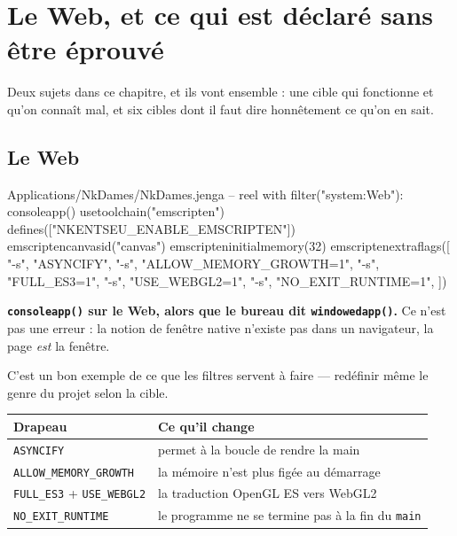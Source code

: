 \chapter{Le Web, et ce qui est déclaré sans être éprouvé}

Deux sujets dans ce chapitre, et ils vont ensemble : une cible qui fonctionne et
qu'on connaît mal, et six cibles dont il faut dire honnêtement ce qu'on en sait.

\section{Le Web}

\begin{nkcode}{Applications/NkDames/NkDames.jenga -- reel}
with filter("system:Web"):
    consoleapp()
    usetoolchain("emscripten")
    defines(["NKENTSEU_ENABLE_EMSCRIPTEN"])
    emscriptencanvasid("canvas")
    emscripteninitialmemory(32)
    emscriptenextraflags([
        "-s", "ASYNCIFY",
        "-s", "ALLOW_MEMORY_GROWTH=1",
        "-s", "FULL_ES3=1",
        "-s", "USE_WEBGL2=1",
        "-s", "NO_EXIT_RUNTIME=1",
    ])
\end{nkcode}

\begin{nkretenir}
\textbf{\texttt{consoleapp()} sur le Web, alors que le bureau dit
\texttt{windowedapp()}.} Ce n'est pas une erreur : la notion de fenêtre native
n'existe pas dans un navigateur, la page \emph{est} la fenêtre.

C'est un bon exemple de ce que les filtres servent à faire --- redéfinir même le
genre du projet selon la cible.
\end{nkretenir}

\begin{center}
\begin{tabular}{@{}ll@{}}
\toprule
\textbf{Drapeau} & \textbf{Ce qu'il change} \\
\midrule
\texttt{ASYNCIFY} & permet à la boucle de rendre la main \\
\texttt{ALLOW\_MEMORY\_GROWTH} & la mémoire n'est plus figée au démarrage \\
\texttt{FULL\_ES3} + \texttt{USE\_WEBGL2} & la traduction OpenGL ES vers WebGL2 \\
\texttt{NO\_EXIT\_RUNTIME} & le programme ne se termine pas à la fin du \texttt{main} \\
\bottomrule
\end{tabular}
\end{center}

